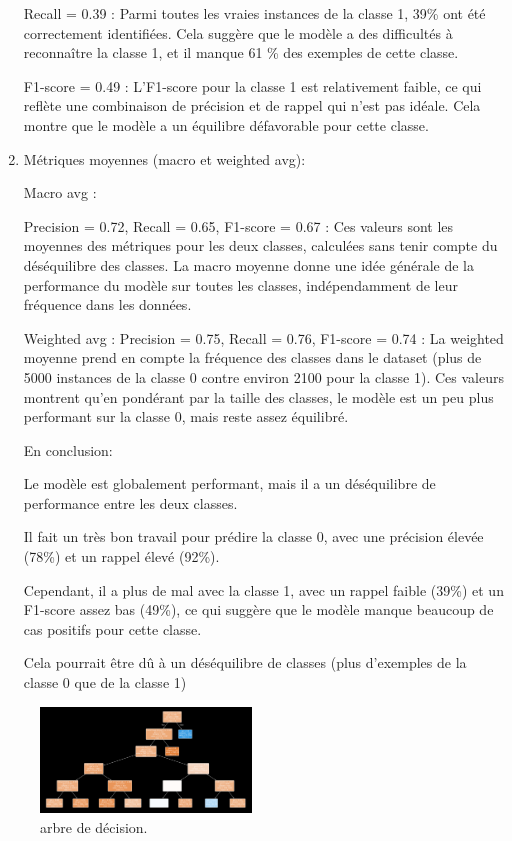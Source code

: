 \begin{enumerate}
Recall = 0.39 :
Parmi toutes les vraies instances de la classe 1, 39\% ont été correctement identifiées. Cela suggère que le modèle a des difficultés à reconnaître la classe 1, et il manque 61 \% des exemples de cette classe.

F1-score = 0.49 :
L'F1-score pour la classe 1 est relativement faible, ce qui reflète une combinaison de précision et de rappel qui n'est pas idéale. Cela montre que le modèle a un équilibre défavorable pour cette classe.

\item Métriques moyennes (macro et weighted avg):

Macro avg :

Precision = 0.72, Recall = 0.65, F1-score = 0.67 :
Ces valeurs sont les moyennes des métriques pour les deux classes, calculées sans tenir compte du déséquilibre des classes. La macro moyenne donne une idée générale de la performance du modèle sur toutes les classes, indépendamment de leur fréquence dans les données.


Weighted avg :
Precision = 0.75, Recall = 0.76, F1-score = 0.74 :
La weighted moyenne prend en compte la fréquence des classes dans le dataset (plus de 5000 instances de la classe 0 contre environ 2100 pour la classe 1). Ces valeurs montrent qu'en pondérant par la taille des classes, le modèle est un peu plus performant sur la classe 0, mais reste assez équilibré.

En conclusion:

Le modèle est globalement performant, mais il a un déséquilibre de performance entre les deux classes. 

Il fait un très bon travail pour prédire la classe 0, avec une précision élevée (78\%) et un rappel élevé (92\%).

Cependant, il a plus de mal avec la classe 1, avec un rappel faible (39\%) et un F1-score assez bas (49\%), ce qui suggère que le modèle manque beaucoup de cas positifs pour cette classe.

Cela pourrait être dû à un déséquilibre de classes (plus d'exemples de la classe 0 que de la classe 1)
\end{enumerate}

\begin{figure}[H]
\centering
\includegraphics[width=0.5\textwidth]{figures/arbre.png}
\caption{arbre de décision.}
\label{fig:arbre_deci}
\end{figure}

